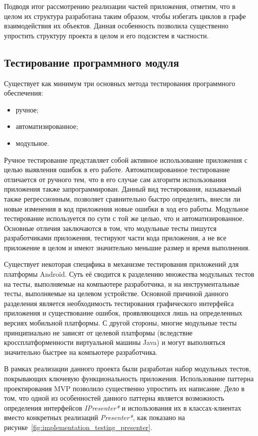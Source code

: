 Подводя итог рассмотрению реализации частей приложения, отметим,
что в целом их структура разработана таким образом,
чтобы избегать циклов в графе взаимодействия их объектов.
Данная особенность позволила существенно упростить
структуру проекта в целом и его подсистем в частности.

\subsection{Тестирование программного модуля}

Существует как минимум три основных метода тестирования
программного обеспечения:
\begin{itemize}
\item ручное;
\item автоматизированное;
\item модульное.
\end{itemize}

Ручное тестирование представляет собой активное использование приложения
с целью выявления ошибок в его работе.
Автоматизированное тестирование отличается от ручного тем,
что в его случае сам алгоритм использования приложения также запрограммирован.
Данный вид тестирования, называемый также регрессионным,
позволяет сравнительно быстро определить,
внесли ли новые изменения в код приложения новые ошибки в ход его работы.
Модульное тестирование используется по сути с той же целью,
что и автоматизированное. Основные отличия заключаются в том,
что модульные тесты пишутся разработчиками приложения,
тестируют части кода приложения, а не все приложение в целом
и имеют значительно меньшие размер и время выполнения.

Существует некоторая специфика в механизме тестирования приложений
для платформы Android. Суть её сводится к разделению множества модульных тестов
на тесты, выполняемые на компьютере разработчика, и на инструментальные тесты,
выполняемые на целевом устройстве.
Основной причиной данного разделения является необходимость тестирования
графического интерфейса приложения и существование ошибок,
проявляющихся лишь на определенных версиях мобильной платформы.
С другой стороны, многие модульные тесты принципиально не зависят от
целевой платформы (вследствие кроссплатформенности виртуальной машины Java)
и могут выполняться значительно быстрее на компьютере разработчика.

В рамках реализации данного проекта были разработан набор модульных тестов,
покрывающих ключевую функциональность приложения.
Использование паттерна проектирования MVP позволило существенно упростить их написание.
Дело в том, что одной из особенностей данного паттерна является возможность
определения интерфейсов \textit{IPresenter*} и использования
их в классах-клиентах вместо конкретных реализаций \textit{Presenter*},
как показано на рисунке~\ref{fig:implementation_testing_presenter}.

